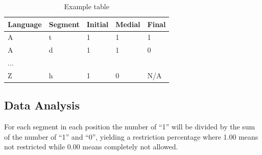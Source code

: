 \begin{table}[h!]
    \centering
    \begin{tabular}{| l | l | l | l | l |}
    \hline
     Language & Segment & Initial & Medial & Final \\ \hline
	A & t & 1 & 1 & 1 \\ \hline
	A & d & 1 & 1 & 0 \\ \hline
	... &  &  &  &  \\ \hline
	Z & h & 1 & 0 & N/A \\ \hline
    \end{tabular}
    \caption{Example table}
    \label{tab:example}
\end{table}

\subsection{Data Analysis}

For each segment in each position the number of ``1'' will be divided by the sum of the number of ``1'' and ``0'', yielding a restriction percentage where 1.00 means not restricted while 0.00 means completely not allowed. 


